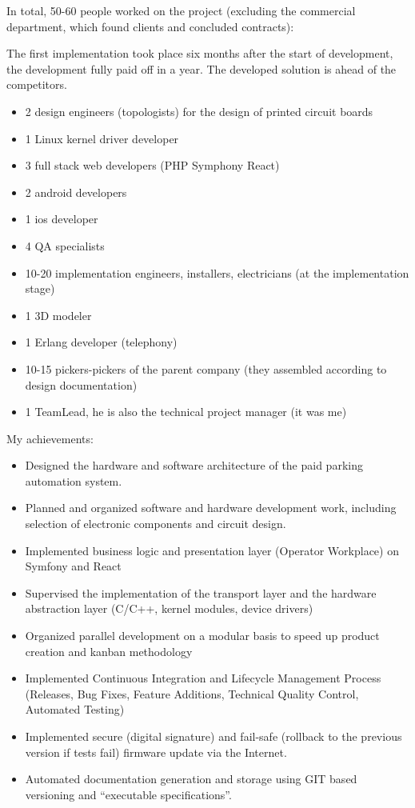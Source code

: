 \documentclass[11pt]{article}
\begin{document}
In total, 50-60 people worked on the project (excluding the
commercial department, which found clients and concluded
contracts):

The first implementation took place six months after the
start of development, the development fully paid off in a
year. The developed solution is ahead of the competitors.
\begin{itemize}
\item 2 design engineers (topologists) for the design of printed
circuit boards
\item 1 Linux kernel driver developer
\item 3 full stack web developers (PHP Symphony React)
\item 2 android developers
\item 1 ios developer
\item 4 QA specialists
\item 10-20 implementation engineers, installers, electricians
(at the implementation stage)
\item 1 3D modeler
\item 1 Erlang developer (telephony)
\item 10-15 pickers-pickers of the parent company (they assembled according to design documentation)
\item 1 TeamLead, he is also the technical project manager (it
was me)
\end{itemize}

My achievements:

\begin{itemize}
\item Designed the hardware and software architecture of the
paid parking automation system.
\item Planned and organized software and hardware development
work, including selection of electronic components and
circuit design.
\item Implemented business logic and presentation layer
(Operator Workplace) on Symfony and React
\item Supervised the implementation of the transport layer and
the hardware abstraction layer (C/C++, kernel modules,
device drivers)
\item Organized parallel development on a modular basis to speed
up product creation and kanban methodology
\item Implemented Continuous Integration and Lifecycle
Management Process (Releases, Bug Fixes, Feature
Additions, Technical Quality Control, Automated Testing)
\item Implemented secure (digital signature) and fail-safe
(rollback to the previous version if tests fail) firmware
update via the Internet.
\item Automated documentation generation and storage using GIT
based versioning and ``executable specifications''.
\end{itemize}
\end{document}
